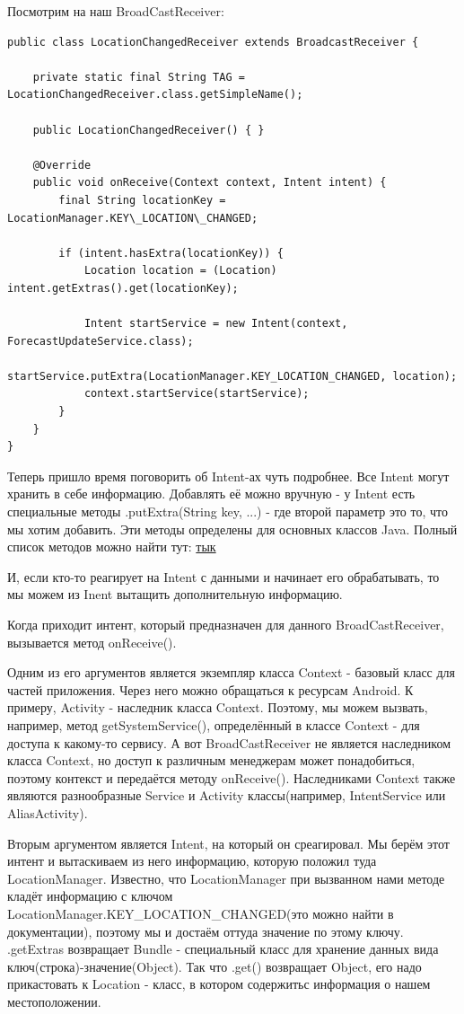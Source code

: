 \documentclass[12 pt]{article}
\begin{document}
    Посмотрим на наш BroadCastReceiver:
            \begin{lstlisting}
public class LocationChangedReceiver extends BroadcastReceiver {

    private static final String TAG = LocationChangedReceiver.class.getSimpleName();

    public LocationChangedReceiver() { }

    @Override
    public void onReceive(Context context, Intent intent) {
        final String locationKey = LocationManager.KEY\_LOCATION\_CHANGED;

        if (intent.hasExtra(locationKey)) {
            Location location = (Location) intent.getExtras().get(locationKey);

            Intent startService = new Intent(context, ForecastUpdateService.class);
            startService.putExtra(LocationManager.KEY_LOCATION_CHANGED, location);
            context.startService(startService);
        }
    }
}
    \end{lstlisting}

      Теперь пришло время поговорить об Intent-ах чуть подробнее. Все Intent могут хранить в себе информацию. Добавлять её можно вручную - у Intent есть специальные методы .putExtra(String key, ...) - где второй параметр это то, что мы хотим добавить. Эти методы определены для основных классов Java. Полный список методов можно найти тут: \href{https://developer.android.com/reference/android/content/Intent.html}{тык}
    
        И, если кто-то реагирует на Intent с данными и начинает его обрабатывать, то мы можем из Inent вытащить дополнительную информацию. 
        
        Когда приходит интент, который предназначен для данного BroadCastReceiver, вызывается метод onReceive(). 
        
        Одним из его аргументов является экземпляр класса Context - базовый класс для частей приложения. Через него можно обращаться к ресурсам Android. К примеру, Activity - наследник класса Context. Поэтому, мы можем вызвать, например, метод getSystemService(), определённый в классе Context - для доступа к какому-то сервису. А вот BroadCastReceiver не является наследником класса Context, но доступ к различным менеджерам может понадобиться, поэтому контекст и передаётся методу onReceive(). Наследниками Context также являются разнообразные Service и Activity классы(например, IntentService или AliasActivity).
        
        Вторым аргументом является Intent, на который он среагировал. Мы берём этот интент и вытаскиваем из него информацию, которую положил туда LocationManager. Известно, что LocationManager при вызванном нами методе кладёт информацию с ключом LocationManager.KEY\_LOCATION\_CHANGED(это можно найти в документации), поэтому мы и достаём оттуда значение по этому ключу. .getExtras возвращает Bundle - специальный класс для хранение данных вида ключ(строка)-значение(Object). Так что .get() возвращает Object, его надо прикастовать к Location - класс, в котором содержитьс информация о нашем местоположении.
     
\end{document}
